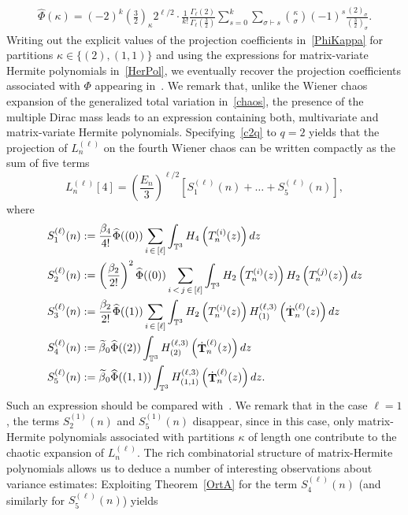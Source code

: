\documentclass[AHL,Unicode,longabstracts,published]{cedram}
\DeclareMathOperator{\bT}{\mathbf{T}}
\newcommand{\T}{\mathbb{T}^3}
\let\oldtilde\tilde
\renewcommand*{\tilde}[1]{\mathchoice{\widetilde{#1}}{\widetilde{#1}}{\oldtilde{#1}}{\oldtilde{#1}}}
\begin{document}
\begin{gather}\label{PhiKappa}
\widehat{\Phi}(\kappa) = (-2)^{k} \left(\frac{3}{2}\right)_{\kappa} 2^{\ell/2} \cdot \frac{1}{k!}\frac{\Gamma_{\ell}(2)}{\Gamma_{\ell}\left(\frac{3}{2}\right)} \sum_{s=0}^{k} \sum_{\sigma \vdash s} \binom{\kappa}{\sigma} (-1)^s\frac{(2)_{\sigma}}{\left(\frac{3}{2}\right)_{\sigma}}.
\end{gather}
Writing out the explicit values of the projection coefficients in~\eqref{PhiKappa} for partitions $\kappa\in \{(2),(1,1)\}$ and using the expressions for matrix-variate Hermite polynomials in~\eqref{HerPol}, we eventually recover the projection coefficients associated with $\Phi$ appearing in~\cite[Proposition~B.5]{Not20}. We remark that, unlike the Wiener chaos expansion of the generalized total variation in~\eqref{chaos}, the presence of the multiple Dirac mass leads to an expression containing both, multivariate and matrix-variate Hermite polynomials. Specifying~\eqref{c2q} to $q=2$ yields that the projection of $L_n^{(\ell)}$ on the fourth Wiener chaos can be written compactly as the sum of five terms
\[
L_n^{(\ell)}[4]=
\left(\frac{E_n}{3}\right)^{\ell/2} \left[S_1^{(\ell)}(n)+\ldots+S_5^{(\ell)}(n)\right],
\]
where
\begin{align*}
S_1^{(\ell)}(n)&:= \frac{\beta_4}{4!}\widehat{\Phi}((0))\sum_{i\,\in\,[\ell]} \int_{\T} H_4\left(T_n^{(i)}(z)\right) dz\\
S_2^{(\ell)}(n) &:=\left(\frac{\beta_2 }{2! }\right)^2\widehat{\Phi}((0))\sum_{i\,<\,j\,\in\,[\ell]} \int_{\T} H_2\left(T_n^{(i)}(z)\right)H_2\left(T_n^{(j)}(z)\right)dz\\
S_3^{(\ell)}(n) &:=\frac{\beta_2}{2!}\widehat{\Phi}((1))\sum_{i\,\in\,[\ell]} \int_{\T} H_2\left(T_n^{(i)}(z)\right) H^{(\ell,3)}_{(1)}\left(\dot{\bT}_n^{(\ell)}(z)\right) dz\\
S_4^{(\ell)}(n) &:=\tilde{\beta}_0\widehat{\Phi}((2)) \int_{\T} H_{(2)}^{(\ell,3)}\left(\dot{\bT}_n^{(\ell)}(z)\right) dz\\
S_5^{(\ell)}(n) &:=\tilde{\beta}_0\widehat{\Phi}((1,1)) \int_{\T} H_{(1,1)}^{(\ell,3)}\left(\dot{\bT}_n^{(\ell)}(z)\right)dz.
\end{align*}
Such an expression should be compared with~\cite[Eq.(3.23)]{Not20}. We remark that in the case $\ell=1$, the terms $S_2^{(1)}(n)$ and $S_5^{(1)}(n)$ disappear, since in this case, only matrix-Hermite polynomials associated with partitions $\kappa$ of length one contribute to the chaotic expansion of $L_n^{(\ell)}$. The rich combinatorial structure of matrix-Hermite polynomials allows us to deduce a number of interesting observations about variance estimates: Exploiting Theorem~\ref{OrtA} for the term $S_4^{(\ell)}(n)$ (and similarly for $S_5^{(\ell)}(n)$) yields
\end{document}
